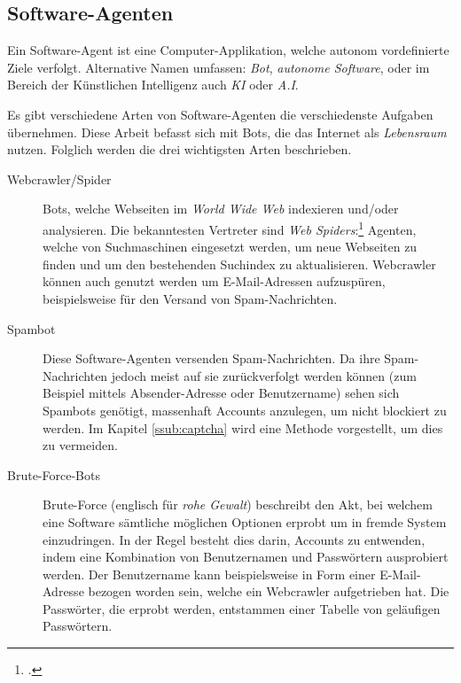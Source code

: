 \subsection{Software-Agenten}
\label{sub:software_agenten}
Ein Software-Agent ist eine Computer-Applikation, welche autonom vordefinierte
Ziele verfolgt. Alternative Namen umfassen: \emph{Bot}, \emph{autonome
Software}, oder im Bereich der Künstlichen Intelligenz auch \emph{KI} oder
\emph{A.I}.

Es gibt verschiedene Arten von Software-Agenten die verschiedenste Aufgaben
übernehmen. Diese Arbeit befasst sich mit Bots, die das Internet als
\emph{Lebensraum} nutzen. Folglich werden die drei wichtigsten Arten
beschrieben.

\begin{description}
  \item[Webcrawler/Spider]\label{term:spider}
  Bots, welche Webseiten im \emph{World Wide Web} indexieren und/oder
  analysieren. Die bekanntesten Vertreter sind \emph{Web
  Spiders}:\footcite{wa:tkWWWRobot} Agenten, welche von Suchmaschinen eingesetzt
  werden, um neue Webseiten zu finden und um den bestehenden Suchindex zu
  aktualisieren. Webcrawler können auch genutzt werden um E-Mail-Adressen
  aufzuspüren, beispielsweise für den Versand von Spam-Nachrichten.
  
  \item[Spambot]
  Diese Software-Agenten versenden Spam-Nachrichten. Da ihre Spam-Nachrichten
  jedoch meist auf sie zurückverfolgt werden können (zum Beispiel mittels
  Absender-Adresse oder Benutzername) sehen sich Spambots genötigt, massenhaft
  Accounts anzulegen, um nicht blockiert zu werden. Im Kapitel
  \ref{ssub:captcha} wird eine Methode vorgestellt, um dies zu vermeiden.
  
  \item[Brute-Force-Bots]
  Brute-Force (englisch für \emph{rohe Gewalt}) beschreibt den Akt, bei welchem
  eine Software sämtliche möglichen Optionen erprobt um in fremde System
  einzudringen. In der Regel besteht dies darin, Accounts zu entwenden, indem
  eine Kombination von Benutzernamen und Passwörtern ausprobiert werden. Der
  Benutzername kann beispielsweise in Form einer E-Mail-Adresse bezogen worden
  sein, welche ein Webcrawler aufgetrieben hat. Die Passwörter, die erprobt
  werden, entstammen einer Tabelle von geläufigen Passwörtern.
\end{description}
